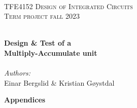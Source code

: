 \documentclass{article}
\begin{document}
\begin{titlepage}
\vbox{ }
\vbox{ }
\begin{center}
\\[1cm]
\textsc{\LARGE TFE4152 Design of Integrated Circuits}\\[1cm]
\textsc{\Large Term project fall 2023}\\[0.5cm]
\vbox{ }

\HRule \\[0.4cm]
{ \huge \bfseries Design \& Test of a \\Multiply-Accumulate unit}\\[0.4cm] %
\HRule \\[1.5cm]

\large
\emph{Authors:}\\
Einar Bergslid \& Kristian Gøystdal %
\vfill

\end{center}
\end{titlepage}









\newpage
{}



\newpage
\vspace*{7 cm}
\begin{center}
\textbf{\Huge Appendices}
\end{center}

\end{document}
